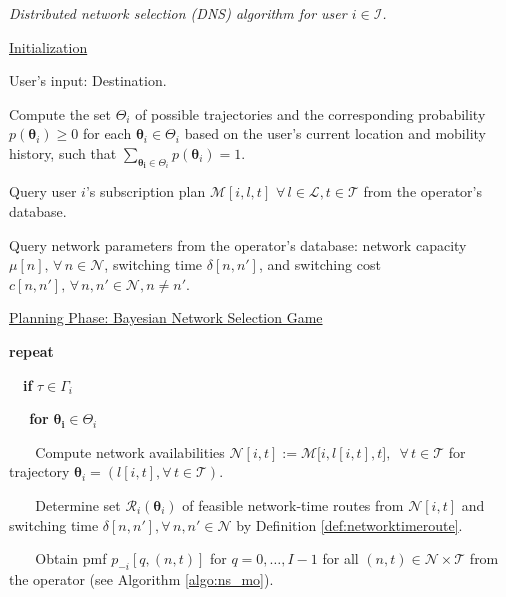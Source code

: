 \documentclass[journal]{IEEEtran}
\newcommand{\mc}[1]{\mathcal{#1}}
\newcommand{\bs}[1]{\boldsymbol{#1}}
\begin{document}
\begin{algorithm} [t] \small
\caption{\emph{Distributed network selection (DNS) algorithm for user $i \in \mathcal{I}$.}}
\begin{algorithmic} [1] 

\STATEx \underline{Initialization}

\STATE User's input: Destination. %

\STATE Compute the set $\Theta_i$ of possible trajectories and the corresponding probability $p(\boldsymbol{\theta}_i) \geq 0$ for each $\boldsymbol{\theta}_i \in \Theta_i$ based on the user's current location and mobility history, such that $\sum_{\bs{\theta_i} \in \Theta_i} p(\boldsymbol{\theta}_i) = 1$.

\STATE Query user $i$'s subscription plan $\mathcal{M}[i,l,t]$ $\forall \, l \in \mathcal{L}, t \in \mathcal{T}$ from the operator's database. %

\STATE Query network parameters from the operator's database: network capacity $\mu[n], \, \forall \, n \in \mathcal{N}$,  switching time $\delta[n,n']$, and switching cost $c[n,n'], \, \forall \, n,n' \in \mathcal{N}, n \neq n'$.



\STATEx \underline{Planning Phase: Bayesian Network Selection Game}

\STATE \textbf{repeat}


\STATE $ \ \ \ $ \textbf{if} $\tau \in \Gamma_i$

\STATE $ \ \ \ \ \ $ \textbf{for} $\bs{\theta_i} \in \Theta_i$

\STATE $ \ \ \ \ \ \ \ $ Compute network availabilities $\mathcal{N}[i,t] := \mathcal{M}\bigl[ i,l[i,t],t \bigr],$ \STATEx \quad\quad\quad\quad $\, \forall \, t \in \mathcal{T}$ for trajectory $\boldsymbol{\theta}_i = (l[i,t], \forall \, t \in \mc{T})$. %

\STATE $ \ \ \ \ \ \ \ $ Determine set $\mathcal{R}_i(\boldsymbol{\theta}_i)$ of feasible network-time routes \STATEx \quad\quad\quad\quad from $\mathcal{N}[i,t]$ and switching time $\delta[n,n'], \forall \, n, n' \in \mc{N}$ \STATEx \quad\quad\quad\quad by Definition \ref{def:networktimeroute}.

\STATE $ \ \ \ \ \ \ \ $ Obtain pmf $p_{-i}[q,(n,t)]$ for $q = 0, \ldots, I-1$ for all \STATEx \quad\quad\quad\quad $(n,t) \in \mathcal{N} \times \mathcal{T}$ from the operator (see Algorithm \ref{algo:ns_mo}). 


\end{algorithmic}
\end{algorithm}
\end{document}
